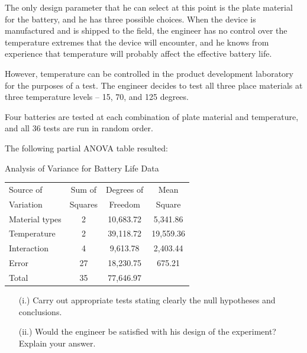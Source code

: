 \documentclass[a4paper,12pt]{article}
\begin{document}
The only design parameter that he can select at this point is the plate material for the battery, and he has three possible choices. 
When the device is manufactured and is shipped to the field, the engineer has no control over the temperature extremes that the device will encounter, and he knows from experience  that temperature will probably affect the effective battery life. 

However, temperature can be controlled in the product development laboratory for the purposes of a test.  The engineer decides to test all three place materials at three temperature levels – 15, 70, and 125 degrees. 

Four batteries are tested at each combination of plate material and temperature, and all 36 tests are run in random order.


The following partial ANOVA table resulted:

Analysis of Variance for Battery Life Data
\begin{center}
\begin{tabular}{|l|c|c|c|}\hline
	Source of & Sum of &\phantom{mak} Degrees of \phantom{mak}& Mean \\
	
	Variation & Squares & Freedom  & Square\\
	
	Material types & 2&  10,683.72 & \phantom{mak} 5,341.86\phantom{mak} \\
	
	Temperature & 2& 39,118.72 & 19,559.36\\
	
	Interaction & 4& 9,613.78 & 2,403.44\\
	
	Error &\phantom{mak} 27\phantom{mak}& 18,230.75 & 675.21\\
	
	Total &35&77,646.97 & \\\hline
\end{tabular} 
\end{center}
\begin{itemize}
\item[(i.)] Carry out appropriate tests stating clearly the null hypotheses and conclusions. 

\item[(ii.)] Would the engineer be satisfied with his design of the experiment? Explain your answer. 
\end{itemize}
\end{document}
